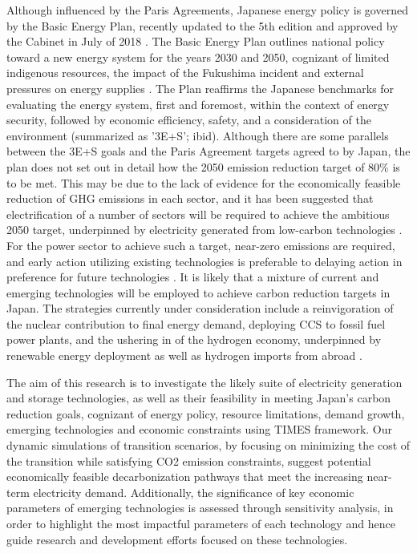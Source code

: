 Although influenced by the Paris Agreements, Japanese energy policy is governed by the Basic Energy Plan, recently updated to the 5th edition and approved by the Cabinet in July of 2018 \cite{noauthor_japans_2018}. The Basic Energy Plan outlines national policy toward a new energy system for the years 2030 and 2050, cognizant of limited indigenous resources, the impact of the Fukushima incident and external pressures on energy supplies \cite{noauthor_annual_2018}. The Plan reaffirms the Japanese benchmarks for evaluating the energy system, first and foremost, within the context of energy security, followed by economic efficiency, safety, and a consideration of the environment (summarized as '3E+S'; ibid). Although there are some parallels between the 3E+S goals and the Paris Agreement targets agreed to by Japan, the plan does not set out in detail how the 2050 emission reduction target of 80\% is to be met. This may be due to the lack of evidence for the economically feasible reduction of GHG emissions in each sector, and it has been suggested that electrification of a number of sectors will be required to achieve the ambitious 2050 target, underpinned by electricity generated from low-carbon technologies \cite{matsuo_quantitative_2018}. For the power sector to achieve such a target, near-zero emissions are required, and early action utilizing existing technologies is preferable to delaying action in preference for future technologies \cite{ashina_roadmap_2012}. It is likely that a mixture of current and emerging technologies will be employed to achieve carbon reduction targets in Japan. The strategies currently under consideration include a reinvigoration of the nuclear contribution to final energy demand, deploying \gls{CCS} to fossil fuel power plants, and the ushering in of the hydrogen economy, underpinned by renewable energy deployment as well as hydrogen imports from abroad \cite{ashina_roadmap_2012, matsuo_quantitative_2018, noauthor_basic_2017}. 

The aim of this research is to investigate the likely suite of electricity generation and storage technologies, as well as their feasibility in meeting Japan's carbon reduction goals, cognizant of energy policy, resource limitations, demand growth, emerging technologies and economic constraints using \gls{TIMES} framework. Our dynamic simulations of transition scenarios, by focusing on minimizing the cost of the transition while satisfying CO2 emission constraints, suggest potential economically feasible decarbonization pathways that meet the increasing near-term electricity demand. Additionally, the significance of key economic parameters of emerging technologies is assessed through sensitivity analysis, in order to highlight the most impactful parameters of each technology and hence guide research and development efforts focused on these technologies.
